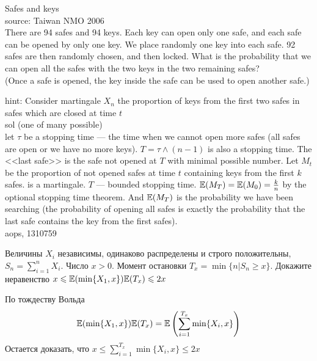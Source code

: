 \begin{problem} 
Safes and keys \\
source: Taiwan NMO 2006\\
There are 94 safes and 94 keys. Each key can open only one safe, and each safe can be opened by only one key. We place randomly one key into each safe. 92 safes are then randomly chosen, and then locked. What is the probability that we can open all the safes with the two keys in the two remaining safes?\\
(Once a safe is opened, the key inside the safe can be used to open another safe.)
\end{problem} 
\begin{solution} 

hint: Consider martingale $X_{n}$ the proportion of keys from the first two safes in safes which are closed at time $t$ \\
sol (one of many possible) \\
let $\tau$ be a stopping time --- the time when we cannot open more safes (all safes are open or we have no more keys). $T=\tau \wedge (n-1)$ is also a stopping time. The <<last safe>> is the safe not opened at $T$ with minimal possible number. Let $M_{t}$  be the proportion of not opened safes at time $t$  containing keys from the first $k$ safes.  is a martingale. $T$ --- bounded stopping time. $\mathbb{E}(M_{T}) = \mathbb{E}(M_{0}) = \frac {k}{n}$ by the optional stopping time theorem. And $\mathbb{E}(M_{T})$ is the probability we have been searching (the probability of opening all safes is exactly the probability that the last safe contains the key from the first  safes). \\
aops, 1310759 
\end{solution}

\begin{problem}
Величины $X_i$ независимы, одинаково распределены и строго положительны, $S_n=\sum_{i=1}^n X_i$. Число $x>0$. Момент остановки $T_x=\min\{n|S_n\geq x\}$. Докажите неравенство $x\leqslant \mathbb{E}(\min\{X_1,x\})\mathbb{E}(T_x)\leqslant 2x$
\end{problem} 
\begin{solution} 
По тождеству Вольда
\begin{equation}
 \mathbb{E}(\min\{X_1,x\})\mathbb{E}(T_x)=\mathbb{E}\left(\sum_{i=1}^{T_x}\min\{X_i,x\} \right)
\end{equation}
Остается доказать, что $x\leq \sum_{i=1}^{T_x}\min\{X_i,x\}\leq 2x $
\end{solution}


